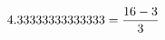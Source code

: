 \documentclass[preview]{standalone}
\begin{document}
\begin{align*}
\special{dvisvgm:raw <g id='unique000'>}4.33333333333333 = \frac{16 - 3}{3}\special{dvisvgm:raw </g>}
\end{align*}
\end{document}
